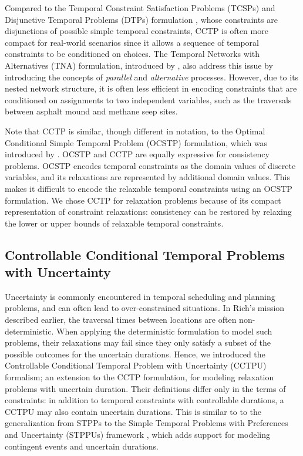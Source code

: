 \documentclass[jair,twoside,11pt,theapa]{article}
\begin{document}
Compared to the Temporal Constraint Satisfaction Problems (TCSPs) and
Disjunctive Temporal Problems (DTPs) formulation
\cite{Dechter_TCN_1991,Stergiou_DTP_1998}, whose constraints are disjunctions of
possible simple temporal constraints, CCTP is often more compact for real-world
scenarios since it allows a sequence of temporal constraints to be conditioned
on choices. The Temporal Networks with Alternatives (TNA) formulation, introduced by , also address this issue by introducing the concepts
of \textit{parallel} and \textit{alternative} processes. However, due to its
nested network structure, it is often less efficient in encoding constraints
that are conditioned on assignments to two independent variables, such as the
traversals between asphalt mound and methane seep sites.


Note that CCTP is similar, though different in notation, to the Optimal
Conditional Simple Temporal Problem (OCSTP) formulation, which was introduced by
. OCSTP and CCTP are equally expressive
for consistency problems. OCSTP encodes temporal constraints as the domain
values of discrete variables, and its relaxations are represented by additional
domain values. This makes it difficult to encode the relaxable temporal
constraints using an OCSTP formulation. We chose CCTP for
relaxation problems because of its compact representation of constraint
relaxations: consistency can be restored by relaxing the lower or upper bounds
of relaxable temporal constraints.


\subsection{Controllable Conditional Temporal Problems with Uncertainty}

%

Uncertainty is commonly encountered in temporal scheduling and planning
problems, and can often lead to over-constrained situations. In Rich's mission
described earlier, the traversal times between locations are often
non-deterministic. When applying the deterministic formulation to model such
problems, their relaxations may fail since they only satisfy a subset of the
possible outcomes for the uncertain durations. Hence, we introduced the
Controllable Conditional Temporal Problem with Uncertainty (CCTPU) formalism; an
extension to the CCTP formulation, for modeling relaxation problems with
uncertain duration. Their definitions differ only in the terms of constraints:
in addition to temporal constraints with controllable durations, a CCTPU may also
contain uncertain durations. This is similar to
to the generalization from STPPs to the Simple Temporal Problems with Preferences and Uncertainty (STPPUs) framework
\cite{rossi2006uncertainty}, which adds support for modeling contingent events and uncertain durations.
\end{document}
